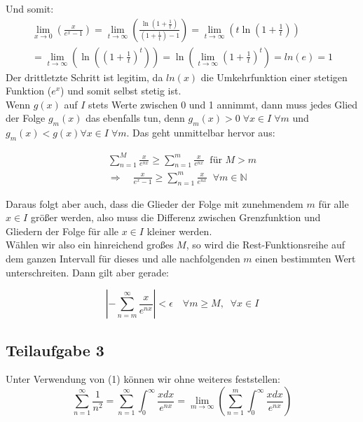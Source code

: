 \documentclass[a4paper,german,12pt,smallheadings]{scrartcl}
\begin{document}
Und somit:
\begin{align*}
\lim\limits_{x \to 0}\left(\frac{x}{e^x-1}\right)=\lim\limits_{t \to \infty}\left(\frac{\ln(1+\frac{1}{t})}{\left(1+\frac{1}{t}\right)-1}\right)=\lim\limits_{t\to\infty}\left(t\ln(1+\frac{1}{t})\right)\\
=\lim\limits_{t\to\infty}\left(\ln\left(\left(1+\frac{1}{t}\right)^t\right)\right)=\ln\left(\lim\limits_{t \to \infty}\left(1+\frac{1}{t}\right)^t\right)=ln(e)=1
\end{align*}
Der drittletzte Schritt ist legitim, da $ln(x)$ die Umkehrfunktion einer stetigen Funktion ($e^x$) und somit selbst stetig ist.\\
Wenn $g(x)$ auf $I$ stets Werte zwischen 0 und 1 annimmt, dann muss jedes Glied der Folge $g_m(x)$ das ebenfalls tun, denn $g_m(x) > 0 \; \forall x\in I \; \forall m$ und $g_m(x) < g(x) \forall x\in I \; \forall m$. Das geht unmittelbar hervor aus:

\begin{align*}
\sum_{n=1}^{M}\frac{x}{e^{nx}} \ge \sum_{n=1}^{m}\frac{x}{e^{nx}} \;\; \text{für $M>m$}\\
\Rightarrow \quad \frac{x}{e^x-1} \ge \sum_{n=1}^{m}\frac{x}{e^{nx}} \;\; \forall m \in \mathbb{N}
\end{align*}

Daraus folgt aber auch, dass die Glieder der Folge mit zunehmendem $m$ für alle $x\in I$ größer werden, also muss die Differenz zwischen Grenzfunktion und Gliedern der Folge für alle $x \in I$ kleiner werden.\\
Wählen wir also ein hinreichend großes $M$, so wird die Rest-Funktionsreihe auf dem ganzen Intervall für dieses und alle nachfolgenden $m$ einen bestimmten Wert unterschreiten. Dann gilt aber gerade:

\begin{equation*}
\left|-\sum_{n=m}^{\infty}\frac{x}{e^{nx}}\right| < \epsilon \quad \forall m\geq M, \;\; \forall x \in I
\end{equation*}

\subsection*{Teilaufgabe 3}

Unter Verwendung von (1) können wir ohne weiteres feststellen:
\begin{equation*}
\sum_{n=1}^{\infty}\frac{1}{n^2}=\sum_{n=1}^{\infty}\int_{0}^{\infty}\frac{xdx}{e^{nx}}=\lim\limits_{m \to \infty}\left(\sum_{n=1}^{m}\int_{0}^{\infty}\frac{xdx}{e^{nx}}\right)
\end{equation*}
\end{document}

